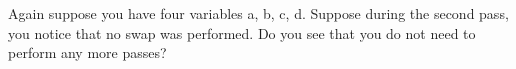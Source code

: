 Again suppose you have four variables a, b, c, d. Suppose during the second pass, you notice that no swap was performed. Do you see that you do not need to perform any more passes?

